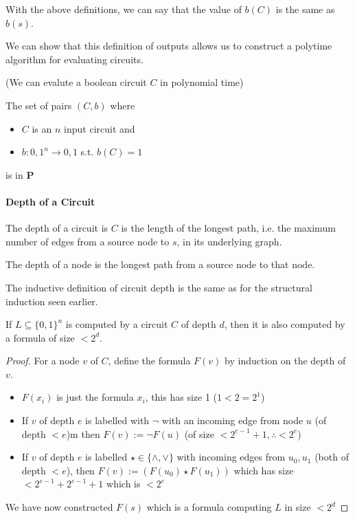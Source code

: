 \documentclass{report}
\begin{document}
With the above definitions, we can say that the value of $b(C)$ is the same as $b(s)$.

We can show that this definition of outputs allows us to construct a polytime algorithm for evaluating circuits.

\begin{proposition}(We can evalute a boolean circuit $C$ in polynomial time)

  The set of pairs $(C,b)$ where
  \begin{itemize}
    \item $C$ is an $n$ input circuit and
    \item $b : { 0,1 }^{n} \rightarrow { 0,1 } $ s.t. $b(C) = 1$
  \end{itemize}
  is in $\mathbf{P} $
\end{proposition}

\paragraph{Depth of a Circuit}

The depth of a circuit is $C$ is the length of the longest path, i.e. the maximum number of edges from a source node to $s$, in its underlying graph.

The depth of a node is the longest path from a source node to that node.

The inductive definition of circuit depth is the same as for the structural induction seen earlier.

\begin{proposition}
  If $L\subseteq \{ 0,1 \} ^{n}$ is computed by a circuit $C$ of depth $d$, then it is also computed by a formula of size $< 2^{d}$.
\end{proposition}

\begin{proof}
  For a node $v$ of $C$, define the formula $F(v)$ by induction on the depth of $v$.

  \begin{itemize}
    \item $F(x_{i})$ is just the formula $x_{i}$, this has size 1 ($1 < 2 = 2^1$)
    \item If $v$ of depth $e$ is labelled with \(\neg\) with an incoming edge from node $u$ (of depth $< e$)m then $F(v) := \neg F(u)$ (of size $< 2^{e-1}+1, \therefore < 2^{e}$)
    \item If $v$ of depth $e$ is labelled $\star \in \{ \wedge,\vee \} $ with incoming edges from $u_{0},u_{1}$ (both of depth $< e$), then $F(v) := (F(u_{0})\star F(u_{1}))$ which has size $<2^{e-1}+2^{e-1} + 1$ which is $< 2^{e}$
  \end{itemize}

  We have now constructed $F(s)$ which is a formula computing $L$ in size $< 2^{d}$
\end{proof}
\end{document}
